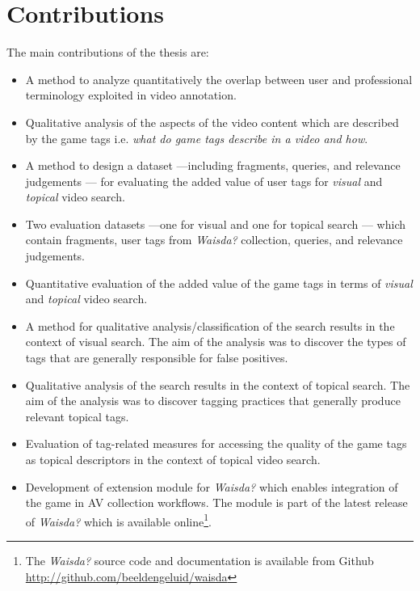\section{Contributions}
The main contributions of the thesis are:
\begin{itemize}
\item A method to analyze quantitatively the overlap between user and professional terminology exploited in video annotation.
\item Qualitative analysis of the aspects of the video content which are described by the game tags i.e. \textit{what do game tags describe in a video and how}.
\item A method to design a dataset ---including fragments, queries, and relevance judgements --- for evaluating the added value of user tags for \textit{visual} and \textit{topical} video search.
\item Two evaluation datasets ---one for visual and one for topical search --- which contain fragments, user tags from \textit{Waisda?} collection, queries, and relevance judgements.
\item Quantitative evaluation of the added value of the game tags in terms of \textit{visual} and \textit{topical} video search.

\item A method for qualitative analysis/classification of the search results in the context of visual search. The aim of the analysis was to discover the types of tags that are generally responsible for false positives.

\item Qualitative analysis of the search results in the context of topical search. The aim of the analysis was to discover tagging practices that generally produce relevant topical tags.

\item Evaluation of tag-related measures for accessing the quality of the game tags as topical descriptors in the context of topical video search.

\item Development of extension module for \textit{Waisda?} which enables integration of the game in AV collection workflows. The module is part of the latest release of \textit{Waisda?} which is available online\footnote{The \textit{Waisda?} source code and documentation is available from Github \url{http://github.com/beeldengeluid/waisda}}.
\end{itemize}

